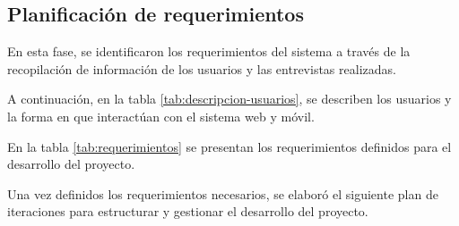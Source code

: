 \subsection{Planificación de requerimientos}
En esta fase, se identificaron los requerimientos del sistema a través de la recopilación de información de los
usuarios y las entrevistas realizadas.
\bigbreak

A continuación, en la tabla \ref{tab:descripcion-usuarios}, se describen los usuarios y la forma en que interactúan con
el sistema web y móvil.



En la tabla \ref{tab:requerimientos} se presentan los requerimientos definidos para el desarrollo del proyecto.



Una vez definidos los requerimientos necesarios, se elaboró el siguiente plan de iteraciones para estructurar y gestionar
el desarrollo del proyecto.


